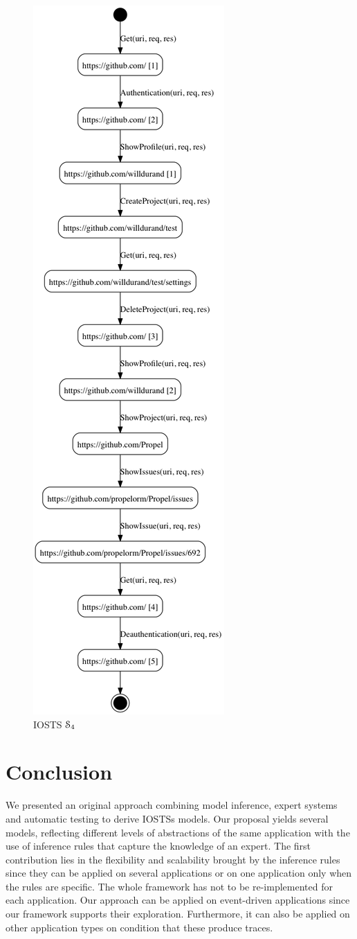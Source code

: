 \begin{figure}[ht]
    \begin{center}
        \includegraphics[width=.2\textwidth]{figures/gh-2-4-bis.png}
    \end{center}

    \caption {IOSTS $\EuScript{S}_4$}
    \label{fig:git:iosts}
\end{figure}


\section{Conclusion}
\label{sec:modelinf:webapps:conclusion}

We presented an original approach combining model inference,
expert systems and automatic testing to derive IOSTSs models. Our
proposal yields several models, reflecting different levels of
abstractions of the same application with the use of inference
rules that capture the knowledge of an expert. The first
contribution lies in the flexibility and scalability brought by
the inference rules since they can be applied on several
applications or on one application only when the rules are
specific. The whole framework has not to be re-implemented for
each application. Our approach can be applied on event-driven
applications since our framework supports their exploration.
Furthermore, it can also be applied on other application types on
condition that these produce traces.
